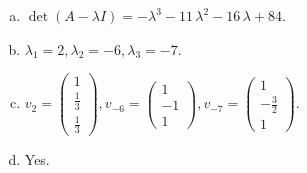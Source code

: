 \begin{questions}
\begin{solution}
\begin{enumerate}[(a)]
\item $\det(A-\lambda I)=-{\lambda}^{3} - 11 \, {\lambda}^{2} - 16 \, {\lambda} + 84$.
\item ${\lambda}_1=2, {\lambda}_2=-6, {\lambda}_3=-7$.
\item $v_{2}=\left(\begin{array}{r}
1 \\
\frac{1}{3} \\
\frac{1}{3}
\end{array}\right), v_{-6}=\left(\begin{array}{r}
1 \\
-1 \\
1
\end{array}\right), v_{-7}=\left(\begin{array}{r}
1 \\
-\frac{3}{2} \\
1
\end{array}\right)$.
\item Yes.
\end{enumerate}
\end{solution}

\end{questions}

\newpage


\begin{center}
\end{center}

